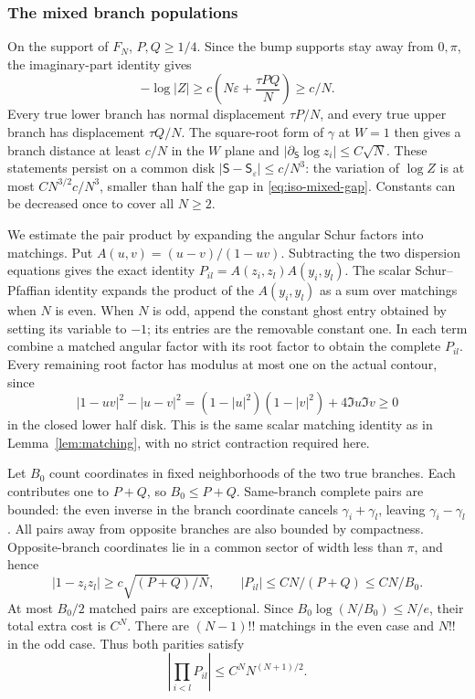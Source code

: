 \documentclass[11pt]{article}
\numberwithin{equation}{section}
\theoremstyle{definition}
\newcommand{\eps}{\varepsilon}
\begin{document}
\subsubsection{The mixed branch populations}

On the support of $F_N$, $P,Q\ge1/4$.  Since the bump supports stay
away from $0,\pi$, the imaginary-part identity gives
\begin{equation}\label{eq:iso-mixed-gap}
 -\log|Z|\ge c\left(N\eps+\frac{\tau PQ}{N}\right)\ge c/N.
\end{equation}
Every true lower branch has normal displacement $\tau P/N$, and every
true upper branch has displacement $\tau Q/N$.  The square-root form
of $\gamma$ at $W=1$ then gives a branch distance at least $c/N$ in
the $W$ plane and $|\partial_{\mathsf S}\log z_i|\le C\sqrt N$.
These statements persist on a common disk
$|\mathsf S-\mathsf S_\eps|\le c/N^3$: the variation of $\log Z$
is at most $CN^{3/2}c/N^3$, smaller than half the gap in
\eqref{eq:iso-mixed-gap}.  Constants can be decreased once to cover
all $N\ge2$.

We estimate the pair product by expanding the angular Schur factors into matchings.
Put $A(u,v)=(u-v)/(1-uv)$.  Subtracting the two dispersion equations
gives the exact identity $P_{il}=A(z_i,z_l)A(y_i,y_l)$.
The scalar Schur--Pfaffian identity expands the product of the
$A(y_i,y_l)$ as a sum over matchings when $N$ is even.  When $N$ is
odd, append the constant ghost entry obtained by setting its variable
to $-1$; its entries are the removable constant one.  In each term
combine a matched angular factor with its root factor to obtain the
complete $P_{il}$.  Every remaining root factor has modulus at most
one on the actual contour, since
\begin{equation}\label{eq:iso-halfdisk-identity}
 |1-uv|^2-|u-v|^2
   =(1-|u|^2)(1-|v|^2)+4\Im u\Im v\ge0
\end{equation}
in the closed lower half disk.  This is the same scalar matching
identity as in Lemma~\ref{lem:matching}, with no strict contraction
required here.

Let $B_0$ count coordinates in fixed neighborhoods of the two true
branches.  Each contributes one to $P+Q$, so $B_0\le P+Q$.
Same-branch complete pairs are bounded: the even inverse in the
branch coordinate cancels $\gamma_i+\gamma_l$, leaving
$\gamma_i-\gamma_l$.  All pairs away from opposite branches are also
bounded by compactness.  Opposite-branch coordinates lie in a common
sector of width less than $\pi$, and hence
\[
 |1-z_i z_l|\ge c\sqrt{(P+Q)/N},\qquad
 |P_{il}|\le CN/(P+Q)\le CN/B_0.
\]
At most $B_0/2$ matched pairs are exceptional.  Since
$B_0\log(N/B_0)\le N/e$, their total extra cost is $C^N$.
There are $(N-1)!!$ matchings in the even case and $N!!$ in the odd
case.  Thus both parities satisfy
\begin{equation}\label{eq:iso-mixed-pairs}
 \left|\prod_{i<l}P_{il}\right|\le C^N N^{(N+1)/2}.
\end{equation}
\end{document}
